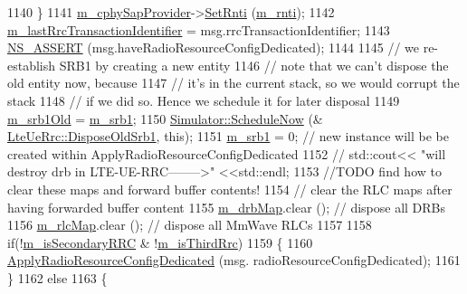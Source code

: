 \begin{DoxyCode}
1140           \}
1141           \hyperlink{classns3_1_1LteUeRrc_a0441858e31f56c75678afa92b7c7193d}{m\_cphySapProvider}->\hyperlink{classns3_1_1LteUeCphySapProvider_a536164e9d83f2bf3413beeda528fe635}{SetRnti} (\hyperlink{classns3_1_1LteUeRrc_a8e078d8ef0ad23e670fe2ef08caab84f}{m\_rnti});
1142           \hyperlink{classns3_1_1LteUeRrc_a01851d519c1a0355b2f0b76ffb540321}{m\_lastRrcTransactionIdentifier} = msg.rrcTransactionIdentifier;
1143           \hyperlink{assert_8h_a6dccdb0de9b252f60088ce281c49d052}{NS\_ASSERT} (msg.haveRadioResourceConfigDedicated);
1144 
1145           \textcolor{comment}{// we re-establish SRB1 by creating a new entity}
1146           \textcolor{comment}{// note that we can't dispose the old entity now, because}
1147           \textcolor{comment}{// it's in the current stack, so we would corrupt the stack}
1148           \textcolor{comment}{// if we did so. Hence we schedule it for later disposal}
1149           \hyperlink{classns3_1_1LteUeRrc_a0f9ba002db6bffa220c9333a9ff09448}{m\_srb1Old} = \hyperlink{classns3_1_1LteUeRrc_aeb8ad627a3df9126d146bacb6dc3dce6}{m\_srb1};
1150           \hyperlink{classns3_1_1Simulator_a2219ee02c0647adc83d1c918c3256266}{Simulator::ScheduleNow} (&
      \hyperlink{classns3_1_1LteUeRrc_ad19a088ff16c8c403c9f93cdcd72e639}{LteUeRrc::DisposeOldSrb1}, \textcolor{keyword}{this});
1151           \hyperlink{classns3_1_1LteUeRrc_aeb8ad627a3df9126d146bacb6dc3dce6}{m\_srb1} = 0; \textcolor{comment}{// new instance will be be created within ApplyRadioResourceConfigDedicated}
1152          \textcolor{comment}{// std::cout<< "will destroy drb in LTE-UE-RRC-------->" <<std::endl;}
1153           \textcolor{comment}{//TODO find how to clear these maps and forward buffer contents!}
1154           \textcolor{comment}{// clear the RLC maps after having forwarded buffer content }
1155           \hyperlink{classns3_1_1LteUeRrc_aa85c5bdde73c2072b2b3053e629bdce0}{m\_drbMap}.clear (); \textcolor{comment}{// dispose all DRBs}
1156           \hyperlink{classns3_1_1LteUeRrc_a64b3948cda818827b8774d7a2be7ea4f}{m\_rlcMap}.clear (); \textcolor{comment}{// dispose all MmWave RLCs}
1157 
1158           \textcolor{keywordflow}{if}(!\hyperlink{classns3_1_1LteUeRrc_a00a3ffa4dd31c1ab66921a9a019f5586}{m\_isSecondaryRRC} & !\hyperlink{classns3_1_1LteUeRrc_a5412b24e867c43a3ca7ed055e1b20c09}{m\_isThirdRrc})
1159           \{
1160             \hyperlink{classns3_1_1LteUeRrc_af7c2bc93366a56a35793c3ef6bce5ce3}{ApplyRadioResourceConfigDedicated} (msg.
      radioResourceConfigDedicated);
1161           \}
1162           \textcolor{keywordflow}{else}
1163           \{

\end{DoxyCode}
